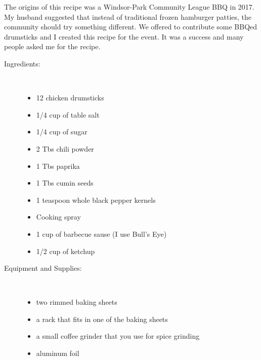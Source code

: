 \documentclass[11pt,letterpaper]{article}
\begin{document}


The origins of this recipe was a Windsor-Park Community League BBQ in 2017. My husband suggested that instead of traditional frozen hamburger patties, the community should try something different. We offered to contribute some BBQed drumsticks and I created this recipe for the event. It was a success and many people asked me for the recipe.

\begin{description}

\item[Ingredients:]\ \\
	\begin{itemize}
	\item 12 chicken drumsticks
	\item 1/4 cup of table salt
	\item 1/4 cup of sugar
	\item 2 Tbs chili powder
	\item 1 Tbs paprika
	\item 1 Tbs cumin seeds
	\item 1 teaspoon whole black pepper kernels
	\item Cooking spray
	\item 1 cup of barbecue sause (I use Bull's Eye)
	\item 1/2 cup of ketchup
	\end{itemize}
\item[Equipment and Supplies:]\ \\
	\begin{itemize}
	\item two rimmed baking sheets 
	\item a rack that fits in one of the baking sheets
	\item a small coffee grinder that you use for spice grinding
	\item aluminum foil
	\end{itemize}


\end{description}
\end{document}
